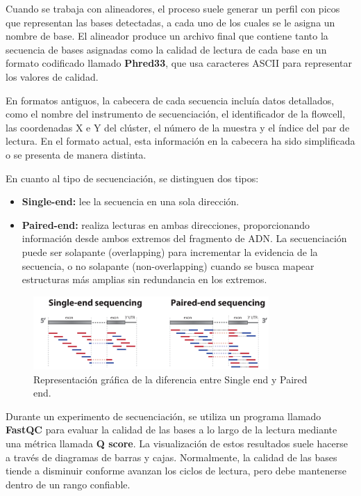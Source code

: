 \begin{itemize}
Cuando se trabaja con alineadores, el proceso suele generar un perfil con picos que representan las bases detectadas, a cada uno de los cuales se le asigna un nombre de base. El alineador produce un archivo final que contiene tanto la secuencia de bases asignadas como la calidad de lectura de cada base en un formato codificado llamado \textbf{Phred33}, que usa caracteres ASCII para representar los valores de calidad.

En formatos antiguos, la cabecera de cada secuencia incluía datos detallados, como el nombre del instrumento de secuenciación, el identificador de la flowcell, las coordenadas X e Y del clúster, el número de la muestra y el índice del par de lectura. En el formato actual, esta información en la cabecera ha sido simplificada o se presenta de manera distinta.

En cuanto al tipo de secuenciación, se distinguen dos tipos:
\begin{itemize}
\item \textbf{Single-end:} lee la secuencia en una sola dirección.
\item \textbf{Paired-end:} realiza lecturas en ambas direcciones, proporcionando información desde ambos extremos del fragmento de ADN. La secuenciación puede ser solapante (overlapping) para incrementar la evidencia de la secuencia, o no solapante (non-overlapping) cuando se busca mapear estructuras más amplias sin redundancia en los extremos.
\end{itemize}

\begin{figure}[htbp]
\centering
\includegraphics[width = 0.8\textwidth]{figs/singleEndVsPairedEnd.png}
\caption{Representación gráfica de la diferencia entre Single end y Paired end.}
\end{figure}

Durante un experimento de secuenciación, se utiliza un programa llamado \textbf{FastQC} para evaluar la calidad de las bases a lo largo de la lectura mediante una métrica llamada \textbf{Q score}. La visualización de estos resultados suele hacerse a través de diagramas de barras y cajas. Normalmente, la calidad de las bases tiende a disminuir conforme avanzan los ciclos de lectura, pero debe mantenerse dentro de un rango confiable.


\end{itemize}
